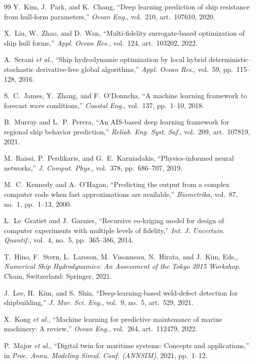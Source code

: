 \documentclass[conference]{IEEEtran}
\begin{document}
\begin{thebibliography}{99}
 Y.~Kim, J.~Park, and K.~Chang, ``Deep learning prediction of
ship resistance from hull-form parameters,'' \emph{Ocean Eng.}, vol.~210,
art.~107610, 2020.

 X.~Liu, W.~Zhao, and D.~Wan, ``Multi-fidelity surrogate-based
optimization of ship hull forms,'' \emph{Appl. Ocean Res.}, vol.~124,
art.~103202, 2022.

 A.~Serani \emph{et al.}, ``Ship hydrodynamic optimization
by local hybrid deterministic--stochastic derivative-free global algorithms,''
\emph{Appl. Ocean Res.}, vol.~59, pp.~115--128, 2016.

 S.~C.~James, Y.~Zhang, and F.~O'Donncha, ``A machine
learning framework to forecast wave conditions,'' \emph{Coastal Eng.},
vol.~137, pp.~1--10, 2018.

 B.~Murray and L.~P.~Perera, ``An AIS-based deep learning
framework for regional ship behavior prediction,'' \emph{Reliab. Eng. Syst.
Saf.}, vol.~209, art.~107819, 2021.

 M.~Raissi, P.~Perdikaris, and G.~E.~Karniadakis,
``Physics-informed neural networks,'' \emph{J. Comput. Phys.}, vol.~378,
pp.~686--707, 2019.

 M.~C.~Kennedy and A.~O'Hagan, ``Predicting the output from
a complex computer code when fast approximations are available,''
\emph{Biometrika}, vol.~87, no.~1, pp.~1--13, 2000.

 L.~Le~Gratiet and J.~Garnier, ``Recursive co-kriging
model for design of computer experiments with multiple levels of fidelity,''
\emph{Int. J. Uncertain. Quantif.}, vol.~4, no.~5, pp.~365--386, 2014.

 T.~Hino, F.~Stern, L.~Larsson, M.~Visonneau, N.~Hirata, and
J.~Kim, Eds., \emph{Numerical Ship Hydrodynamics: An Assessment of the Tokyo
2015 Workshop}. Cham, Switzerland: Springer, 2021.

 J.~Lee, H.~Kim, and S.~Shin, ``Deep-learning-based weld-defect
detection for shipbuilding,'' \emph{J. Mar. Sci. Eng.}, vol.~9, no.~5,
art.~529, 2021.

 X.~Kong \emph{et al.}, ``Machine learning for predictive
maintenance of marine machinery: A review,'' \emph{Ocean Eng.}, vol.~264,
art.~112479, 2022.

 P.~Major \emph{et al.}, ``Digital twin for maritime systems:
Concepts and applications,'' in \emph{Proc. Annu. Modeling Simul. Conf.
(ANNSIM)}, 2021, pp.~1--12.

\end{thebibliography}
\end{document}
